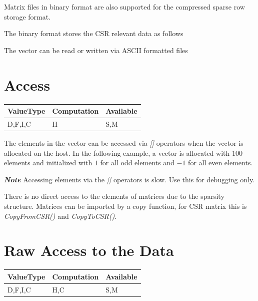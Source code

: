 Matrix files in binary format are also supported for the compressed sparse row storage format.

The binary format stores the CSR relevant data as follows


The vector can be read or written via ASCII formatted files


\section{Access}

\begin{table}[H]
\begin{tabular}{l|l|l}
\multicolumn{1}{c|}{ValueType} & Computation & Available \\ \hline
D,F,I,C                        & H           & S,M    
\end{tabular}
\end{table}


The elements in the vector can be accessed via \emph{[]} operators when the vector is allocated on the host. In the following example, a vector is allocated with 100 elements and initialized with $1$ for all odd elements and $-1$ for all even elements.


\textbf{\emph{Note}} Accessing elements via the \emph{[]} operators is slow. Use this for debugging only.

There is no direct access to the elements of matrices due to the sparsity structure. Matrices can be imported by a copy function, for CSR matrix this is \emph{CopyFromCSR()} and \emph{CopyToCSR()}.


\section{Raw Access to the Data}

\begin{table}[H]
\begin{tabular}{l|l|l}
\multicolumn{1}{c|}{ValueType} & Computation & Available \\ \hline
D,F,I,C                        & H,C          & S,M    
\end{tabular}
\end{table}


